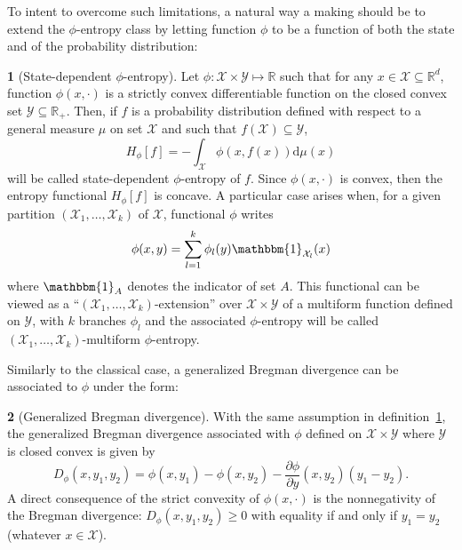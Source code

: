 \documentclass[english,sort&compress]{elsarticle}
\theoremstyle{definition}
\newtheorem{defn}{\protect\definitionname}
\theoremstyle{plain}
\theoremstyle{plain}
\providecommand{\definitionname}{Definition}
\def\dmu{\mathrm{d}\mu}
\def\Rset{\mathbb{R}}
\def\X{\mathcal{X}}
\def\Y{\mathcal{Y}}
\def\un{\mathbbm{1}}
\begin{document}
To intent  to overcome  such limitations, a  natural way  a making should  be to
extend the $\phi$-entropy  class by letting function $\phi$ to  be a function of
both the state and of the probability distribution:
%
\begin{defn}[State-dependent $\phi$-entropy]\label{def:asym_phi-entropy}
  Let $\phi: \X \times  \Y \mapsto \Rset$ such that for any  $x \in \X \subseteq
  \Rset^d$,  function  $\phi(x,\cdot)$   is  a  strictly  convex  differentiable
  function on the  closed convex set $\Y \subseteq \Rset_+$.  Then,  if $f$ is a
  probability distribution  defined with respect  to a general measure  $\mu$ on
  set $\X$ and such that $f(\X) \subseteq \Y$,
  \begin{equation}\label{eq:asym_phi-entropy}
    H_\phi[f] = - \int_\X \phi(x,f(x)) \dmu(x)
  \end{equation}
  will be  called state-dependent $\phi$-entropy of  $f$.  Since $\phi(x,\cdot)$
  is convex, then the entropy functional $H_\phi[f]$ is concave.
  A particular case arises when, for  a given partition $(\X_1 , \ldots , \X_k)$
  of $\X$, functional $\phi$ writes
  \begin{equation}\label{eq:multiform_phi-entropy}
    \phi(x,y) = \sum_{l=1}^k \phi_l(y) \un_{\X_l}(x)
  \end{equation}
  where $\un_A$ denotes the indicator of set $A$.  This functional can be viewed
  as a ``$(\X_1 , \ldots , \X_k)$-extension'' over $\X \times \Y$ of a multiform
  function  defined on  $\Y$,  with  $k$ branches  $\phi_l$  and the  associated
  $\phi$-entropy   will   be  called   $(\X_1   ,   \ldots  ,   \X_k)$-multiform
  $\phi$-entropy.
\end{defn}

Similarly  to  the classical  case,  a  generalized  Bregman divergence  can  be
associated to $\phi$ under the form:
%
\begin{defn}[Generalized Bregman divergence]\label{def:GeneralizedBregman} 
  With  the   same  assumption  in   definition~\ref{def:asym_phi-entropy},  the
  generalized Bregman  divergence associated with  $\phi$ defined on  $\X \times
  \Y$ where $\Y$ is closed convex is given by
  \begin{equation}
    D_\phi(x,y_1,y_2) = \phi(x,y_1) - \phi(x,y_2) - \frac{\partial
   \phi}{\partial y}(x,y_2) \left( y_1 - y_2 \right).
  \end{equation}
  A  direct  consequence of  the  strict  convexity  of $\phi(x,\cdot)$  is  the
  nonnegativity  of  the  Bregman  divergence: $D_\phi(x,y_1,y_2)  \ge  0$  with
  equality if and only if $y_1 = y_2$ (whatever $x \in \X$).
\end{defn}
\end{document}
